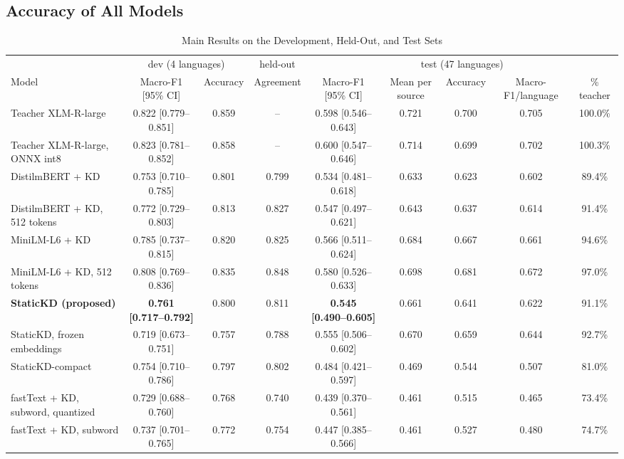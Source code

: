 \documentclass{ieeeaccess}
\begin{document}
\subsection{Accuracy of All Models}
\label{sec:res-acc}
\begin{table}[!t]
\caption{Main Results on the Development, Held-Out, and Test Sets}
\label{tab:main}
\centering
\scriptsize
\setlength{\tabcolsep}{3.5pt}
\begin{tabular}{@{}lcccccccc@{}}
\toprule
 & \multicolumn{2}{c}{dev (4 languages)} & held-out & \multicolumn{5}{c}{test (47 languages)} \\
\cmidrule(lr){2-3}\cmidrule(lr){4-4}\cmidrule(lr){5-9}
Model & Macro-F1 [95\% CI] & Accuracy & Agreement & Macro-F1 [95\% CI] & Mean per source & Accuracy & Macro-F1/language & \% teacher \\
\midrule
Teacher XLM-R-large & 0.822 [0.779--0.851] & 0.859 & -- & 0.598 [0.546--0.643] & 0.721 & 0.700 & 0.705 & 100.0\% \\
Teacher XLM-R-large, ONNX int8 & 0.823 [0.781--0.852] & 0.858 & -- & 0.600 [0.547--0.646] & 0.714 & 0.699 & 0.702 & 100.3\% \\
\midrule
DistilmBERT + KD & 0.753 [0.710--0.785] & 0.801 & 0.799 & 0.534 [0.481--0.618] & 0.633 & 0.623 & 0.602 & 89.4\% \\
DistilmBERT + KD, 512 tokens & 0.772 [0.729--0.803] & 0.813 & 0.827 & 0.547 [0.497--0.621] & 0.643 & 0.637 & 0.614 & 91.4\% \\
MiniLM-L6 + KD & 0.785 [0.737--0.815] & 0.820 & 0.825 & 0.566 [0.511--0.624] & 0.684 & 0.667 & 0.661 & 94.6\% \\
MiniLM-L6 + KD, 512 tokens & 0.808 [0.769--0.836] & 0.835 & 0.848 & 0.580 [0.526--0.633] & 0.698 & 0.681 & 0.672 & 97.0\% \\
\midrule
\textbf{StaticKD (proposed)} & \textbf{0.761 [0.717--0.792]} & 0.800 & 0.811 & \textbf{0.545 [0.490--0.605]} & 0.661 & 0.641 & 0.622 & 91.1\% \\
StaticKD, frozen embeddings & 0.719 [0.673--0.751] & 0.757 & 0.788 & 0.555 [0.506--0.602] & 0.670 & 0.659 & 0.644 & 92.7\% \\
StaticKD-compact & 0.754 [0.710--0.786] & 0.797 & 0.802 & 0.484 [0.421--0.597] & 0.469 & 0.544 & 0.507 & 81.0\% \\
\midrule
fastText + KD, subword, quantized & 0.729 [0.688--0.760] & 0.768 & 0.740 & 0.439 [0.370--0.561] & 0.461 & 0.515 & 0.465 & 73.4\% \\
fastText + KD, subword & 0.737 [0.701--0.765] & 0.772 & 0.754 & 0.447 [0.385--0.566] & 0.461 & 0.527 & 0.480 & 74.7\% \\

\end{tabular}
\end{table}
\end{document}
